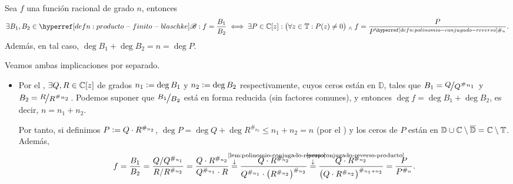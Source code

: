 \begin{cor}\label{cor:carac-cociente-prod-finito-blaschke-fn-racional}
    Sea $f$ una función racional de grado $n$, entonces
    \[
    \begin{aligned}
        \exists B_1, B_2  \in \exhyperref[defn:producto-finito-blaschke]{producto-finito-blaschke}{\mathscr{B}} : f = \frac{B_1}{B_2} \iff \exists P \in \C[z] : \big(\forall z \in \mathbb{T} : P(z) \neq 0\big) \we f = \frac{P}{P^{\exhyperref[defn:polinomio-conjugado-reverso]{polinomio-conjugado-reverso}{\#_n}}}.
    \end{aligned}
    \]
    Además, en tal caso, $\deg B_1 + \deg B_2 = n = \deg P$.
\end{cor}
\begin{dem}
    Veamos ambas implicaciones por separado.
    \begin{itemize}[wide, labelindent=0pt]
        \item[$\boxed{\Rightarrow}$] Por el , $\exists Q, R \in \mathbb{C}[z]$ de grados $n_1 \vcentcolon= \deg B_1$ y $n_2 \vcentcolon=\deg B_2$ respectivamente, cuyos ceros están en $\mathbb{D}$, tales que $B_1 = \sfrac{Q}{Q^{\#_{n_1}}}$ y $B_2 = \sfrac{R}{R^{\#_{n_2}}}$. Podemos suponer que $\sfrac{B_1}{B_2}$ está en forma reducida (sin factores comunes), y entonces $\deg f = \deg B_1 + \deg B_2$, es decir, $n = n_1 + n_2$.
        
        Por tanto, si definimos $P \vcentcolon= Q \cdot R^{\#_{n_2}}$, $\deg P = \deg Q + \deg R^{\#_{n_2}} \leq n_1 + n_2 = n$ (por el ) y los ceros de $P$ están en $\mathbb{D} \cup \mathbb{C} \setminus \overline{\mathbb{D}} = \mathbb{C} \setminus \mathbb{T}$. Además,
        \[
        f = \frac{B_1}{B_2} = \frac{Q / Q^{\#_{n_1}}}{R / R^{\#_{n_2}}} = \frac{Q \cdot R^{\#_{n_2}}}{Q^{\#_{n_1}} \cdot R} \upexpl{=}{\exref[lem:polinomio-conjugado-reverso]{lem-polinomio-conjugado-reverso}}  \frac{Q \cdot R^{\#_{n_2}}}{Q^{\#_{n_1}} \cdot \left(R^{\#_{n_2}}\right)^{\#_{n_2}}} \upexpl{=}{\exref[prop:conjugado-reverso-producto]{prop-conjugado-reverso-producto}} \frac{Q \cdot R^{\#_{n_2}}}{\left(Q \cdot R^{\#_{n_2}}\right)^{\#_{n_1 + n_2}}} = \frac{P}{P^{\#_n}}.
        \]



\end{itemize}
\end{dem}
